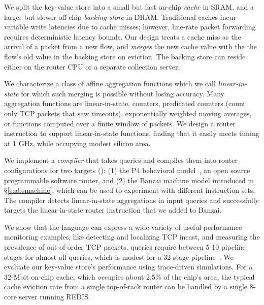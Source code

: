 We split the key-value store into a small but fast on-chip {\em cache} in SRAM,
and a larger but slower off-chip {\em backing store} in DRAM. Traditional caches
incur variable write latencies due to cache misses; however, line-rate packet
forwarding requires deterministic latency bounds. Our design treats a cache miss
as the arrival of a packet from a new flow, and {\em merges} the new cache value
with the the flow's old value in the backing store on eviction. The backing
store can reside either on the router CPU or a separate collection server.

We characterize a class of affine aggregation functions which we call {\em
  linear-in-state} for which
such merging is possible without losing accuracy. Many aggregation functions are
linear-in-state, \eg counters, predicated counters (\eg count only TCP packets
that saw timeouts), exponentially weighted moving averages, or functions
computed over a finite window of packets.  We design a router instruction to
support linear-in-state functions, finding that it easily meets
timing at 1 GHz, while occupying modest silicon area.

 We implement a {\em compiler} that takes \TheSystem
queries and compiles them into router configurations for two targets
(): (1) the P4 behavioral model~\cite{p4-bmv2}, an open source
programmable software router, and (2) the Banzai machine model introduced in
\S\ref{s:absmachine}, which can be used to experiment with
different instruction sets.  The \TheSystem compiler detects linear-in-state
aggregations in input queries and successfully targets the linear-in-state router
instruction that we added to Banzai.

We show that the \TheSystem language can express a wide variety of useful
performance monitoring examples, like detecting and localizing TCP incast, and
measuring the prevalence of out-of-order TCP packets. \TheSystem queries require
between 5-10 pipeline stages for almost all queries, which is modest for a
32-stage pipeline~\cite{rmt}. We evaluate our key-value store's performance
using trace-driven simulations. For a 32-Mbit on-chip cache, which occupies
about 2.5\% of the chip's area, the typical cache eviction rate from a single
top-of-rack router can be handled by a single 8-core server running
REDIS.
